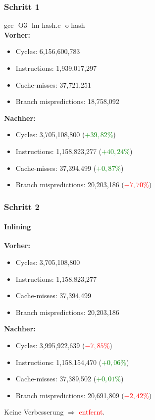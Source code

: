 \documentclass{beamer}
\newcommand{\success}[1]{\textcolor{green}{#1}}
\newcommand{\fail}[1]{\textcolor{red}{#1}}
\begin{document}
  \begin{frame}
  	\frametitle{Schritt 1}
  	gcc -O3 -lm hash.c -o hash\\[1em]
  	\textbf{Vorher:}
  	\begin{itemize}
			\item Cycles: 6,156,600,783\\
			\item Instructions: 1,939,017,297\\
			\item Cache-misses: 37,721,251\\
			\item Branch mispredictions: 18,758,092\\
		\end{itemize}	
		
		\textbf{Nachher:}
  	\begin{itemize}
			\item Cycles: 3,705,108,800 (\success{$+ 39,82 \%$})\\
			\item Instructions: 1,158,823,277 (\success{$+ 40,24 \%$})\\
			\item Cache-misses: 37,394,499 (\success{$+ 0,87 \%$})\\
			\item Branch mispredictions: 20,203,186 (\fail{$- 7,70 \%$})\\
		\end{itemize}	
  \end{frame}
  
  \begin{frame}
  	\frametitle{Schritt 2}
		\framesubtitle{Inlining}
  	\textbf{Vorher:}
  	\begin{itemize}
			\item Cycles: 3,705,108,800 \\
			\item Instructions: 1,158,823,277\\
			\item Cache-misses: 37,394,499\\
			\item Branch mispredictions: 20,203,186\\
		\end{itemize}	
				
		\textbf{Nachher:}
  	\begin{itemize}
			\item Cycles: 3,995,922,639 (\fail{$- 7,85 \%$})\\
			\item Instructions:  1,158,154,470 (\success{$+ 0,06 \%$})\\
			\item Cache-misses: 37,389,502 (\success{$+ 0,01 \%$})\\
			\item Branch mispredictions: 20,691,809 (\fail{$- 2,42 \%$})\\
		\end{itemize}			
		Keine Verbesserung $\Rightarrow$ \fail{entfernt}.
  \end{frame}
  
\end{document}
